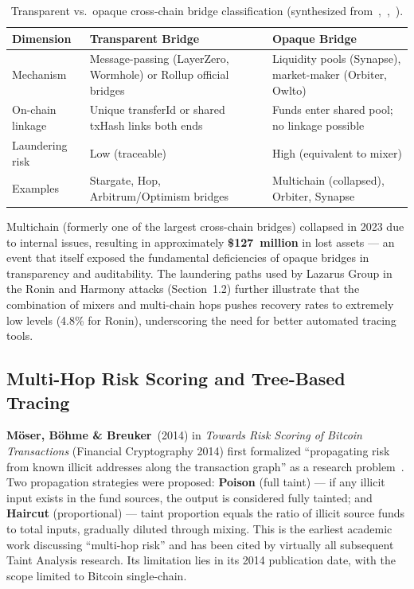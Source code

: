 \documentclass[12pt,a4paper]{article}
\begin{document}
\begin{table}[htbp]
\centering
\caption{Transparent vs.\ opaque cross-chain bridge classification (synthesized from~\cite{mazorra2023},~\cite{sun2025track},~\cite{ren2025survey}).}
\label{tab:bridge_classification}
\small
\begin{tabularx}{\textwidth}{l X X}
\toprule
\textbf{Dimension} & \textbf{Transparent Bridge} & \textbf{Opaque Bridge} \\
\midrule
Mechanism & Message-passing (LayerZero, Wormhole) or Rollup official bridges & Liquidity pools (Synapse), market-maker (Orbiter, Owlto) \\
On-chain linkage & Unique transferId or shared txHash links both ends & Funds enter shared pool; no linkage possible \\
Laundering risk & Low (traceable) & High (equivalent to mixer) \\
Examples & Stargate, Hop, Arbitrum/Optimism bridges & Multichain (collapsed), Orbiter, Synapse \\
\bottomrule
\end{tabularx}
\end{table}

Multichain (formerly one of the largest cross-chain bridges) collapsed in 2023 due to internal issues, resulting in approximately \textbf{\$127~million} in lost assets --- an event that itself exposed the fundamental deficiencies of opaque bridges in transparency and auditability. The laundering paths used by Lazarus Group in the Ronin and Harmony attacks (Section~1.2) further illustrate that the combination of mixers and multi-chain hops pushes recovery rates to extremely low levels (4.8\% for Ronin), underscoring the need for better automated tracing tools.

\subsection{Multi-Hop Risk Scoring and Tree-Based Tracing}

\textbf{M\"{o}ser, B\"{o}hme \& Breuker}~(2014) in \textit{Towards Risk Scoring of Bitcoin Transactions} (Financial Cryptography 2014) first formalized ``propagating risk from known illicit addresses along the transaction graph'' as a research problem~\cite{moser2014}. Two propagation strategies were proposed: \textbf{Poison} (full taint) --- if any illicit input exists in the fund sources, the output is considered fully tainted; and \textbf{Haircut} (proportional) --- taint proportion equals the ratio of illicit source funds to total inputs, gradually diluted through mixing. This is the earliest academic work discussing ``multi-hop risk'' and has been cited by virtually all subsequent Taint Analysis research. Its limitation lies in its 2014 publication date, with the scope limited to Bitcoin single-chain.
\end{document}
